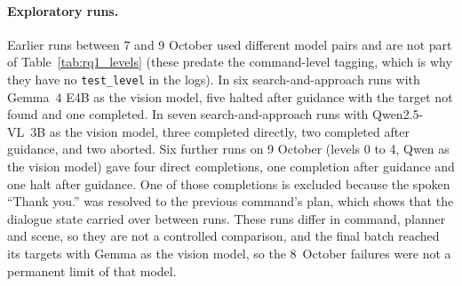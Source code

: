 \paragraph{Exploratory runs.} Earlier runs between 7 and 9 October used different model pairs and are not part of
Table~\ref{tab:rq1_levels} (these predate the command-level tagging, which is why they have no \texttt{test\_level}
in the logs). In six search-and-approach runs with Gemma~4 E4B as the vision model, five halted after guidance with
the target not found and one completed. In seven search-and-approach runs with Qwen2.5-VL~3B as the vision model,
three completed directly, two completed after guidance, and two aborted. Six further runs on 9 October (levels 0 to
4, Qwen as the vision model) gave four direct completions, one completion after guidance and one halt after
guidance. One of those completions is excluded because the spoken ``Thank you.'' was resolved to the previous
command's plan, which shows that the dialogue state carried over between runs. These runs differ in command,
planner and scene, so they are not a controlled comparison, and the final batch reached its targets with Gemma as
the vision model, so the 8~October failures were not a permanent limit of that model.

